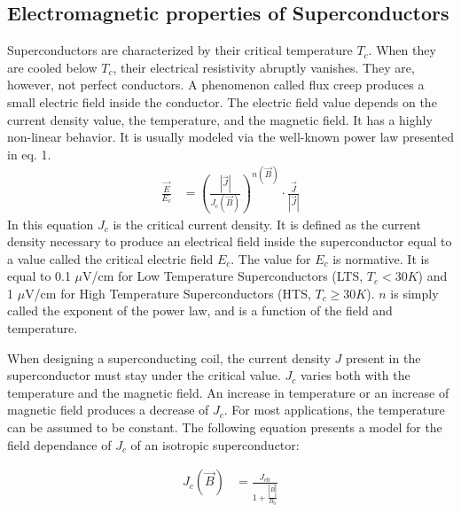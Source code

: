 \documentclass{ws-jmrr}
\begin{document}
\begin{multicols}{2}
\section{Electromagnetic properties of Superconductors}
\label{elec}
Superconductors are characterized by their critical temperature $T_c$. When they are cooled below $T_c$, their electrical resistivity abruptly vanishes. They are, however, not perfect conductors. A phenomenon called flux creep \cite{feigel1989theory} produces a small electric field inside the conductor. The electric field value depends on the current density value, the temperature, and the magnetic field. It has a highly non-linear behavior. It is usually modeled via the well-known power law \cite{ONOGI1989991} presented in eq. 1.
\begin{align}
\frac{\vec{E}}{E_c}&=\left (\frac{|\vec{J}|}{J_c(\vec{B})}  \right )^{n(\vec{B})}\cdot \frac{\vec{J}}{|\vec{J}|}
\label{powerlaw}
\end{align}
In this equation $J_ c$ is the critical current density. It is defined as the current density necessary to produce an electrical field inside the superconductor equal to a value called the critical electric field $E_c$. The value for $E_c$ is normative. It is equal to 0.1 $\mu$V/cm for Low Temperature Superconductors (LTS, $T_c<30K$) and 1 $\mu$V/cm for High Temperature Superconductors (HTS, $T_c \geq 30K$). $n$ is simply called the exponent of the power law, and is a function of the field and temperature.\par
When designing a superconducting coil, the current density $J$ present in the superconductor must stay under the critical value. $J_c$ varies both with the temperature and the magnetic field. An increase in temperature or an increase of magnetic field produces a decrease of $J_c$. For most applications, the temperature can be assumed to be constant. The following equation presents a model for the field dependance of $J_c$ of an isotropic superconductor: 

\begin{align}
J_c(\vec{B})&=\frac{J_{\textrm{c0}}}{1+\frac{|\vec{B}|}{B_0}}
\label{model1}
\end{align}


\end{multicols}
\end{document}
